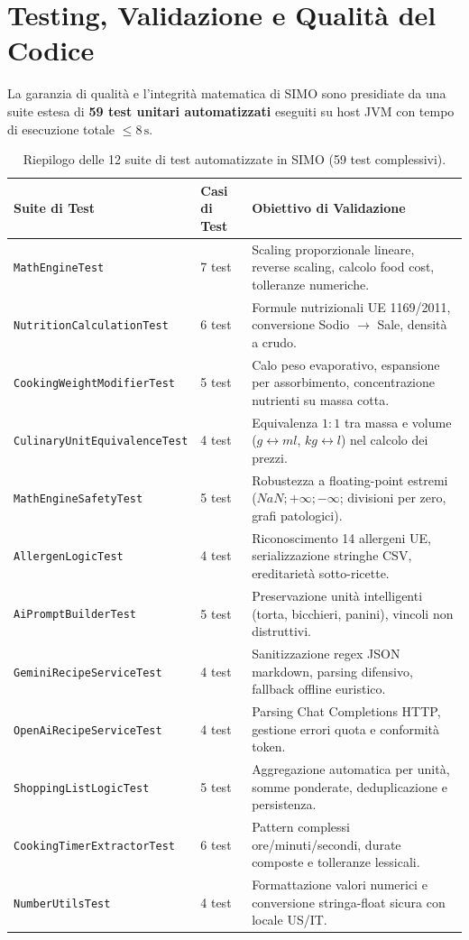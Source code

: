 \documentclass[11pt,a4paper,titlepage]{article}
\begin{document}
\section{Testing, Validazione e Qualit\`a del Codice}
La garanzia di qualit\`a e l'integrit\`a matematica di SIMO sono presidiate da una suite estesa di \textbf{59 test unitari automatizzati} eseguiti su host JVM con tempo di esecuzione totale $\le 8\,\text{s}$.

\begin{table}[h!]
\centering
\small
\begin{tabularx}{\textwidth}{llX}
\toprule
\textbf{Suite di Test} & \textbf{Casi di Test} & \textbf{Obiettivo di Validazione} \\
\midrule
\texttt{MathEngineTest} & 7 test & Scaling proporzionale lineare, reverse scaling, calcolo food cost, tolleranze numeriche. \\
\texttt{NutritionCalculationTest} & 6 test & Formule nutrizionali UE 1169/2011, conversione Sodio $\to$ Sale, densit\`a a crudo. \\
\texttt{CookingWeightModifierTest} & 5 test & Calo peso evaporativo, espansione per assorbimento, concentrazione nutrienti su massa cotta. \\
\texttt{CulinaryUnitEquivalenceTest} & 4 test & Equivalenza $1:1$ tra massa e volume ($g \leftrightarrow ml$, $kg \leftrightarrow l$) nel calcolo dei prezzi. \\
\texttt{MathEngineSafetyTest} & 5 test & Robustezza a floating-point estremi ($NaN; +\infty; -\infty$; divisioni per zero, grafi patologici). \\
\texttt{AllergenLogicTest} & 4 test & Riconoscimento 14 allergeni UE, serializzazione stringhe CSV, ereditariet\`a sotto-ricette. \\
\texttt{AiPromptBuilderTest} & 5 test & Preservazione unit\`a intelligenti (torta, bicchieri, panini), vincoli non distruttivi. \\
\texttt{GeminiRecipeServiceTest} & 4 test & Sanitizzazione regex JSON markdown, parsing difensivo, fallback offline euristico. \\
\texttt{OpenAiRecipeServiceTest} & 4 test & Parsing Chat Completions HTTP, gestione errori quota e conformit\`a token. \\
\texttt{ShoppingListLogicTest} & 5 test & Aggregazione automatica per unit\`a, somme ponderate, deduplicazione e persistenza. \\
\texttt{CookingTimerExtractorTest} & 6 test & Pattern complessi ore/minuti/secondi, durate composte e tolleranze lessicali. \\
\texttt{NumberUtilsTest} & 4 test & Formattazione valori numerici e conversione stringa-float sicura con locale US/IT. \\
\bottomrule
\end{tabularx}
\caption{Riepilogo delle 12 suite di test automatizzate in SIMO (59 test complessivi).}
\label{tab:test_suite}
\end{table}
\end{document}
